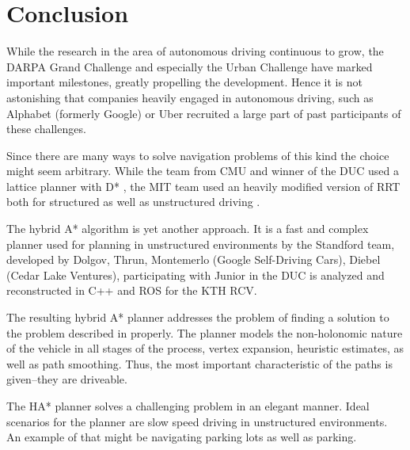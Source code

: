 \chapter{Conclusion}
While the research in the area of autonomous driving continuous to grow, the DARPA Grand Challenge and especially the Urban Challenge have marked important milestones, greatly propelling the development. Hence it is not astonishing that companies heavily engaged in autonomous driving, such as Alphabet (formerly Google) or Uber recruited a large part of past participants of these challenges.

Since there are many ways to solve navigation problems of this kind the choice might seem arbitrary. While the team from CMU and winner of the DUC used a lattice planner with D* \cite{Ferguson.2008b,Likhachev.2005}, the MIT team used an heavily modified version of RRT both for structured as well as unstructured driving \cite{Kuwata.2008}.

The hybrid A* algorithm is yet another approach. It is a fast and complex planner used for planning in unstructured environments by the Standford team, developed by Dolgov, Thrun, Montemerlo (Google Self-Driving Cars), Diebel (Cedar Lake Ventures), participating with Junior in the DUC is analyzed and reconstructed in C++ and ROS for the KTH RCV.

The resulting hybrid A* planner addresses the problem of finding a solution to the problem described in  properly. The planner models the non-holonomic nature of the vehicle in all stages of the process, vertex expansion, heuristic estimates, as well as path smoothing. Thus, the most important characteristic of the paths is given--they are driveable. 

The HA* planner solves a challenging problem in an elegant manner. Ideal scenarios for the planner are slow speed driving in unstructured environments. An example of that might be navigating parking lots as well as parking.